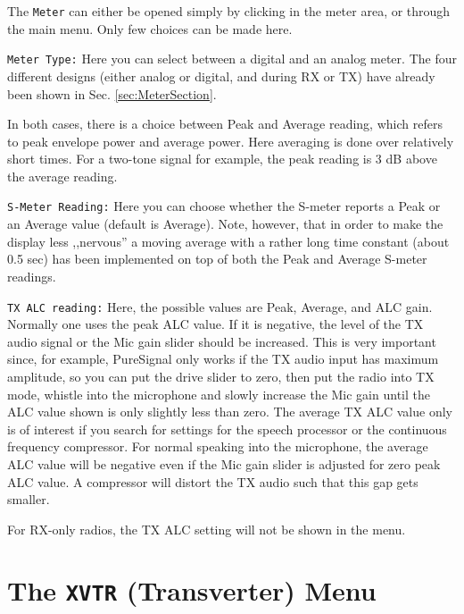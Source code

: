 \documentclass[12pt]{book}
\def\rett#1{\texttt{\color{red}#1}}
\def\bltt#1{\texttt{\color{blue}#1}}
\begin{document}
The \bltt{Meter} can either be opened simply by clicking in the meter
area, or through the main menu. Only few choices can be made here.

\rett{Meter Type:} Here you can select between a digital and an analog
meter. The four different designs (either analog or digital, and during
RX or TX) have already been shown in Sec. \ref{sec:MeterSection}.

In both cases, there is a choice between Peak and Average reading, which
refers to peak envelope power and average power. Here averaging is done
over relatively short times. For a two-tone signal for example, the peak
reading is 3 dB above the average reading.

\rett{S-Meter Reading:} Here you can choose whether the S-meter reports
a Peak or an Average value (default is Average).
Note, however, that in order to make the
display less ,,nervous'' a moving average with a rather long time constant
(about 0.5 sec) has been implemented on top of both the Peak and Average
S-meter readings.


\rett{TX ALC reading:} Here, the possible values are Peak, Average, and
ALC gain. Normally one uses the peak ALC value. If it is negative, the level
of the TX audio signal or the Mic gain slider should be increased.
This is very important since, for example,
 PureSignal only works if the TX audio input has maximum amplitude,
so you can put the drive slider to zero, then put the radio into TX mode,
whistle into the microphone and slowly increase the Mic gain until the
ALC value shown is only slightly less than zero. The average TX ALC
value only is of interest if  you search for settings for the speech processor
or the continuous frequency compressor. For normal speaking into the microphone,
the average ALC value will be negative even if the Mic gain slider is adjusted
for zero peak ALC value. A compressor will distort the TX audio such that this
gap gets smaller.

For RX-only radios, the TX ALC setting will not be shown in the menu.

\section{The \texttt{XVTR} (Transverter) Menu}
\end{document}

